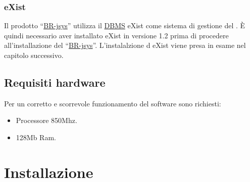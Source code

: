 \subsection{eXist}
Il prodotto ``\underline{BR-jsys}'' utilizza il \underline{DBMS} eXist come sistema di gestione del \rp. \`E quindi necessario aver installato eXist in versione 1.2 prima di procedere all'installazione del ``\underline{BR-jsys}''. L'instalalzione d eXist viene presa in esame nel capitolo successivo.
\section{Requisiti hardware}
Per un corretto e scorrevole funzionamento del software sono richiesti:
\begin{itemize}
\item Processore 850Mhz.
\item 128Mb Ram.
\end{itemize}

\chapter{Installazione}
